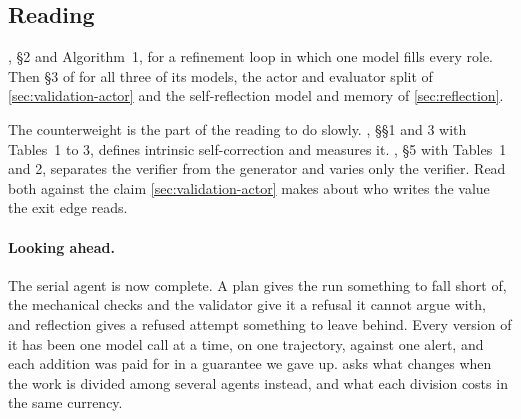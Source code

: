 \ee

\subsection{Reading}

\citet{madaan2023selfrefine}, \S2 and Algorithm~1, for a refinement loop in which one
model fills every role. Then \S3 of \citet{shinn2023reflexion} for all three of its models, the
actor and evaluator split of \cref{sec:validation-actor} and the self-reflection model and memory of
\cref{sec:reflection}.

The counterweight is the part of the reading to do slowly. \citet{huang2024selfcorrect}, \S\S1 and 3
with Tables~1 to 3, defines intrinsic self-correction and measures it. \citet{stechly2025selfverification},
\S5 with Tables~1 and 2, separates the verifier from the generator and varies only the verifier.
Read both against the claim \cref{sec:validation-actor} makes about who writes the value the exit
edge reads.

\paragraph{Looking ahead.}
The serial agent is now complete. A plan gives the run something to fall short of, the mechanical
checks and the validator give it a refusal it cannot argue with, and reflection gives a refused
attempt something to leave behind. Every version of it has been one model call at a time, on one
trajectory, against one alert, and each addition was paid for in a guarantee we gave up.
 asks what changes when the work is divided among several agents instead, and
what each division costs in the same currency.
